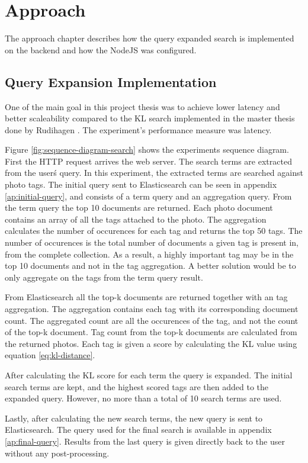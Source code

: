 \chapter{Approach}
\label{ch:approach}
The approach chapter describes how the query expanded search is implemented on the backend and how the NodeJS was configured.

\section{Query Expansion Implementation}
One of the main goal in this project thesis was to achieve lower latency and better scaleability compared to the KL search implemented in the master thesis done by Rudihagen \cite{master-thesis}.
The experiment's performance measure was latency.

Figure \ref{fig:sequence-diagram-search} shows the experiments sequence diagram.
First the HTTP request arrives the web server.
The search terms are extracted from the user\'s query.
In this experiment, the extracted terms are searched against photo tags.
The initial query sent to Elasticsearch can be seen in appendix \ref{ap:initial-query},
and consists of a term query and an aggregation query.
From the term query the top 10 documents are returned.
Each photo document contains an array of all the tags attached to the photo.
The aggregation calculates the number of occurences for each tag and returns the top 50 tags.
The number of occurences is the total number of documents a given tag is present in, from the complete collection.
As a result, a highly important tag may be in the top 10 documents and not in the tag aggregation.
A better solution would be to only aggregate on the tags from the term query result.

From Elasticsearch all the top-k documents are returned together with an tag aggregation.
The aggregation contains each tag with its corresponding document count.
The aggregated count are all the occurences of the tag, and not the count of the top-k document.
Tag count from the top-k documents are calculated from the returned photos.
Each tag is given a score by calculating the KL value using equation \ref{eq:kl-distance}.

After calculating the KL score for each term the query is expanded.
The initial search terms are kept, and the highest scored tags are then added to the expanded query.
However, no more than a total of 10 search terms are used.

Lastly, after calculating the new search terms, the new query is sent to Elasticsearch.
The query used for the final search is available in appendix \ref{ap:final-query}.
Results from the last query is given directly back to the user without any post-processing.

